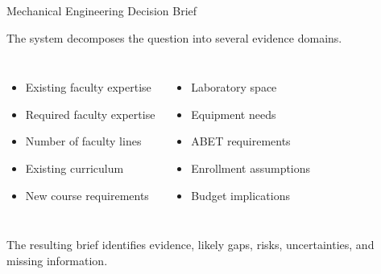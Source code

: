\documentclass[aspectratio=169]{beamer}
\begin{document}
\begin{frame}{Mechanical Engineering Decision Brief}

The system decomposes the question into several evidence domains.

\vspace{0.4cm}

\begin{columns}


\begin{itemize}
\item Existing faculty expertise
\item Required faculty expertise
\item Number of faculty lines
\item Existing curriculum
\item New course requirements
\end{itemize}


\begin{itemize}
\item Laboratory space
\item Equipment needs
\item ABET requirements
\item Enrollment assumptions
\item Budget implications
\end{itemize}

\end{columns}

\vspace{0.6cm}

The resulting brief identifies evidence, likely gaps, risks,
uncertainties, and missing information.

\end{frame}
\end{document}
